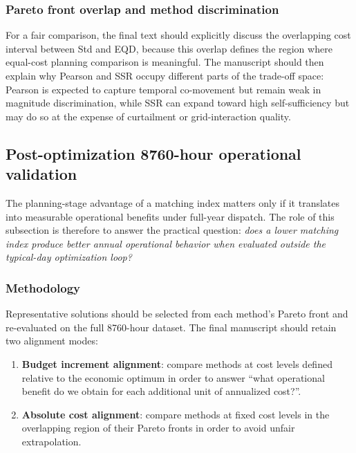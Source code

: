 
\subsubsection{Pareto front overlap and method discrimination}

For a fair comparison, the final text should explicitly discuss the overlapping cost interval between Std and EQD, because this overlap defines the region where equal-cost planning comparison is meaningful. The manuscript should then explain why Pearson and SSR occupy different parts of the trade-off space: Pearson is expected to capture temporal co-movement but remain weak in magnitude discrimination, while SSR can expand toward high self-sufficiency but may do so at the expense of curtailment or grid-interaction quality.

\subsection{Post-optimization 8760-hour operational validation}
\label{sec:post_analysis}

The planning-stage advantage of a matching index matters only if it translates into measurable operational benefits under full-year dispatch. The role of this subsection is therefore to answer the practical question: \emph{does a lower matching index produce better annual operational behavior when evaluated outside the typical-day optimization loop?}

\subsubsection{Methodology}

Representative solutions should be selected from each method's Pareto front and re-evaluated on the full 8760-hour dataset. The final manuscript should retain two alignment modes:

\begin{enumerate}
\item \textbf{Budget increment alignment}: compare methods at cost levels defined relative to the economic optimum in order to answer ``what operational benefit do we obtain for each additional unit of annualized cost?''.
\item \textbf{Absolute cost alignment}: compare methods at fixed cost levels in the overlapping region of their Pareto fronts in order to avoid unfair extrapolation.
\end{enumerate}

